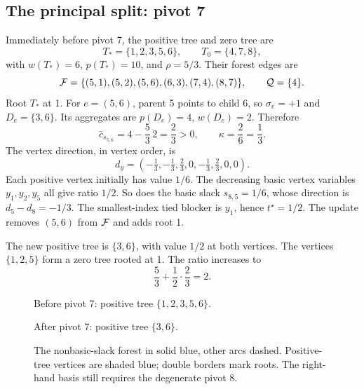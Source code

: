\subsection{The principal split: pivot 7}
Immediately before pivot 7, the positive tree and zero tree are
\[
 T_*=\{1,2,3,5,6\},\qquad T_0=\{4,7,8\},
\]
with $w(T_*)=6$, $p(T_*)=10$, and $\rho=5/3$. Their forest edges are
\[
 \mathcal F=\{(5,1),(5,2),(5,6),(6,3),(7,4),(8,7)\},
 \qquad \mathcal Q=\{4\}.
\]
Root $T_*$ at 1. For $e=(5,6)$, parent 5 points to child 6, so
$\sigma_e=+1$ and $D_e=\{3,6\}$. Its aggregates are $p(D_e)=4$,
$w(D_e)=2$. Therefore
\[
 \bar c_{s_{5,6}}=4-\frac53\,2=\frac23>0,\qquad
 \kappa=\frac{2}{6}=\frac13.
\]
The vertex direction, in vertex order, is
\begin{equation}\label{eq:example-direction}
 d_y=\left(-\tfrac13,-\tfrac13,\tfrac23,0,-\tfrac13,\tfrac23,0,0\right).
\end{equation}
Each positive vertex initially has value $1/6$. The decreasing basic vertex
variables $y_1,y_2,y_5$ all give ratio $1/2$. So does the basic slack
$s_{8,5}=1/6$, whose direction is $d_5-d_8=-1/3$.
The smallest-index tied blocker is $y_1$, hence $t^\star=1/2$.
The update removes $(5,6)$ from $\mathcal F$ and adds root 1.

The new positive tree is $\{3,6\}$, with value $1/2$ at both vertices.
The vertices $\{1,2,5\}$ form a zero tree rooted at 1. The ratio increases to
\[
 \frac53+\frac12\cdot\frac23=2.
\]
\begin{figure}[htbp]
\centering
\begin{minipage}{.49\textwidth}\centering
\resizebox{\linewidth}{!}{}
\small Before pivot 7: positive tree $\{1,2,3,5,6\}$.
\end{minipage}\hfill
\begin{minipage}{.49\textwidth}\centering
\resizebox{\linewidth}{!}{}
\small After pivot 7: positive tree $\{3,6\}$.
\end{minipage}
\caption{The nonbasic-slack forest in solid blue, other arcs dashed.
Positive-tree vertices are shaded blue; double borders mark roots. The
right-hand basis still requires the degenerate pivot 8.}\label{fig:split}
\end{figure}

